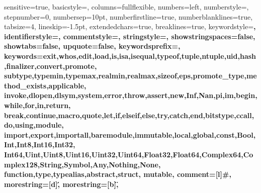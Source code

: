 {
	sensitive=true,	
           basicstyle=\ttfamily\scriptsize,
	columns=fullflexible, %
	numbers=left, 
	numberstyle=\small\ttfamily\color{Gray},
	stepnumber=0,              
	numbersep=10pt, 
	numberfirstline=true, 
	numberblanklines=true, 
	tabsize=4,
	lineskip=-1.5pt,
	extendedchars=true,
	breaklines=true,        
	keywordstyle=\color{Blue}\bfseries,
	identifierstyle=, %
	commentstyle=\sffamily\color{OliveGreen},
	stringstyle=\color{Maroon},
	showstringspaces=false,
	showtabs=false,
	upquote=false,
	keywordsprefix=\@,
	keywords={exit,whos,edit,load,is,isa,isequal,typeof,tuple,ntuple,uid,hash,finalizer,convert,promote,
		subtype,typemin,typemax,realmin,realmax,sizeof,eps,promote_type,method_exists,applicable,
		invoke,dlopen,dlsym,system,error,throw,assert,new,Inf,Nan,pi,im,begin,while,for,in,return,
		break,continue,macro,quote,let,if,elseif,else,try,catch,end,bitstype,ccall,do,using,module,
		import,export,importall,baremodule,immutable,local,global,const,Bool,Int,Int8,Int16,Int32,
		Int64,Uint,Uint8,Uint16,Uint32,Uint64,Float32,Float64,Complex64,Complex128,String,Symbol,Any,Nothing,None,
		function,type,typealias,abstract,struct, mutable},
	comment=[l]{\#},
	morestring=[d]\',
	morestring=[b]\",
}


\graphicspath{{./figures/}}

\setcounter{tocdepth}{2}

\newcommand{\siplibtwo}{\textsf{SIPLIB 2.0}}
\newcommand{\siplib}{\textsf{SIPLIB}}
\newcommand{\miplib}{\textsf{MIPLIB 2010}}
\newcommand{\smps}{\textsf{SMPS}}
\newcommand{\mps}{\textsf{MPS}}
\newcommand{\mpsx}{\textsf{MPSX}}
\newcommand{\jump}{\textsf{JuMP}}
\newcommand{\structjump}{\textsf{StructJuMP}}

\newcommand{\dcap}{\textsf{DCAP}}
\newcommand{\dclp}{\textsf{DCLP}}
\newcommand{\mptsps}{\textsf{MPTSPs}}
\newcommand{\sizes}{\textsf{SIZES}}
\newcommand{\smkp}{\textsf{SMKP}}
\newcommand{\sslp}{\textsf{SSLP}}
\newcommand{\suc}{\textsf{SUC}}

\newcommand{\dsp}{\textsf{DSP}}
\newcommand{\pysp}{\textsf{PySP}}
\newcommand{\pyomo}{\textsf{Pyomo}}
\newcommand{\cplex}{\textsf{CPLEX}}

\newcommand{\julia}{\texttt{Julia}}
\newcommand{\python}{\texttt{Python}}
\newcommand{\clang}{\texttt{C}}
\newcommand{\cpp}{\texttt{C++}}
\newcommand{\matlab}{\texttt{MATLAB}}

